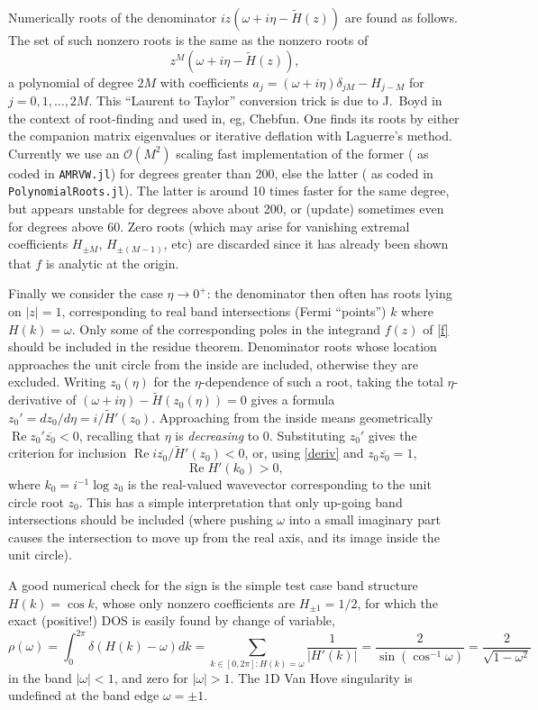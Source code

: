 \documentclass[11pt]{article}
\newcommand{\bigO}{{\mathcal O}}
\DeclareMathOperator{\re}{Re}
\newcommand{\om}{\omega}
\newcommand{\tH}{\tilde H}
\begin{document}
Numerically roots of the denominator $iz(\om + i\eta - \tH(z))$
are found as follows.
The set of such nonzero roots is the same as the nonzero roots of
$$
z^M(\om + i\eta - \tH(z)),
$$
a polynomial of degree $2M$ with coefficients
$a_j = (\om+i\eta)\delta_{jM} - H_{j-M}$ for $j=0,1,\dots,2M$.
This ``Laurent to Taylor'' conversion
trick is due to J.\ Boyd in the context of root-finding and used in, eg,
Chebfun.
One finds its roots by either the companion matrix
eigenvalues or iterative deflation with Laguerre's method.
Currently we use an $\bigO(M^2)$ scaling fast implementation of the former
(\cite{aurentz1,aurentz2} as coded in \texttt{AMRVW.jl})
for degrees greater than 200, else the
latter (\cite{skowron} as coded in \texttt{PolynomialRoots.jl}).
The latter is around 10 times faster for the same degree, but
appears unstable for degrees above about 200,
or (update) sometimes even for degrees above 60.
Zero roots (which may arise for vanishing extremal coefficients
$H_{\pm M}$, $H_{\pm (M-1)}$, etc) are discarded since it has
already been shown that $f$ is analytic at the origin.

Finally we consider
the case $\eta\to0^+$: the denominator then often has roots lying on $|z|=1$,
corresponding to real band intersections (Fermi ``points'')
$k$ where $H(k)=\om$.
Only some of the corresponding poles in the integrand $f(z)$ of \eqref{f}
should be included in the residue theorem.
Denominator roots whose location approaches the unit circle from the inside
are included, otherwise they are excluded.
Writing $z_0(\eta)$ for the $\eta$-dependence of such a root,
taking the total $\eta$-derivative of $(\om+i\eta)-\tH(z_0(\eta)) = 0$
gives a formula $z_0' = dz_0/d\eta = i/\tH'(z_0)$.
Approaching from the inside means geometrically
$\re z_0' \overline{z_0}<0$, recalling
that $\eta$ is \textit{decreasing} to $0$.
Substituting $z_0'$ gives the criterion for inclusion
$\re i \overline{z_0}/\tH'(z_0) <0$, or, using \eqref{deriv}
and $z_0\overline{z_0} = 1$,
$$
\re H'(k_0) > 0,
$$
where $k_0 = i^{-1} \log z_0$ is the real-valued wavevector corresponding to
the unit circle root $z_0$.
This has a simple interpretation that only up-going band intersections
should be included (where pushing $\om$ into a small imaginary
part causes the intersection to move up from the real axis, and its
image inside the unit circle).

A good numerical check for the sign is the simple test case band structure
$H(k) = \cos k$, whose only nonzero coefficients are $H_{\pm1} = 1/2$,
for which the exact (positive!) DOS is easily found by change of variable,
$$
\rho(\om) = \int_0^{2\pi} \delta(H(k)-\om) dk
= \sum_{k\in[0,2\pi]: H(k)=\om} \frac{1}{|H'(k)|}
= \frac{2}{\sin(\cos^{-1} \om)} = \frac{2}{\sqrt{1-\om^2}}
$$
in the band $|\om|<1$, and zero for $|\om|>1$.
The 1D Van Hove singularity is undefined at the band edge $\om=\pm1$.
\end{document}
